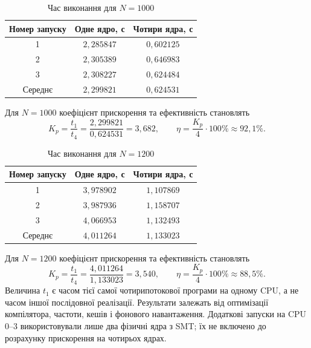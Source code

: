 \begin{table}[H]\centering\renewcommand{\arraystretch}{1.2}
\begin{tabular}{|c|c|c|}\hline Номер запуску & Одне ядро, с & Чотири ядра, с\\\hline
1 & $2{,}285847$ & $0{,}602125$\\\hline
2 & $2{,}305389$ & $0{,}646983$\\\hline
3 & $2{,}308227$ & $0{,}624484$\\\hline
Середнє & $2{,}299821$ & $0{,}624531$\\\hline\end{tabular}
\caption{Час виконання для $N=1000$}
\end{table}
Для $N=1000$ коефіцієнт прискорення та ефективність становлять
\begin{equation} K_p=\frac{t_1}{t_4}=\frac{2{,}299821}{0{,}624531}=3{,}682,\qquad \eta=\frac{K_p}{4}\cdot100\%\approx 92{,}1\%.\end{equation}
\begin{table}[H]\centering\renewcommand{\arraystretch}{1.2}
\begin{tabular}{|c|c|c|}\hline Номер запуску & Одне ядро, с & Чотири ядра, с\\\hline
1 & $3{,}978902$ & $1{,}107869$\\\hline
2 & $3{,}987936$ & $1{,}158707$\\\hline
3 & $4{,}066953$ & $1{,}132493$\\\hline
Середнє & $4{,}011264$ & $1{,}133023$\\\hline\end{tabular}
\caption{Час виконання для $N=1200$}
\end{table}
Для $N=1200$ коефіцієнт прискорення та ефективність становлять
\begin{equation} K_p=\frac{t_1}{t_4}=\frac{4{,}011264}{1{,}133023}=3{,}540,\qquad \eta=\frac{K_p}{4}\cdot100\%\approx 88{,}5\%.\end{equation}
Величина $t_1$ є часом тієї самої чотирипотокової програми на одному
CPU, а не часом іншої послідовної реалізації. Результати залежать від
оптимізації компілятора, частоти, кешів і фонового навантаження.
Додаткові запуски на CPU 0--3 використовували лише два фізичні ядра з SMT;
їх не включено до розрахунку прискорення на чотирьох ядрах.
